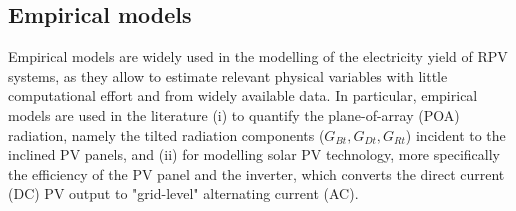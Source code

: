 \subsection{Empirical models}
\label{phys_models}

Empirical models are widely used in the modelling of the electricity yield of RPV systems, as they allow to estimate relevant physical variables with little computational effort and from widely available data. 
In particular, empirical models are used in the literature (i) to quantify the plane-of-array (POA) radiation, namely the tilted radiation components ($G_{Bt}, G_{Dt}, G_{Rt}$) incident to the inclined PV panels, and (ii) for modelling solar PV technology, more specifically the efficiency of the PV panel and the inverter, which converts the direct current (DC) PV output to "grid-level" alternating current (AC). 


